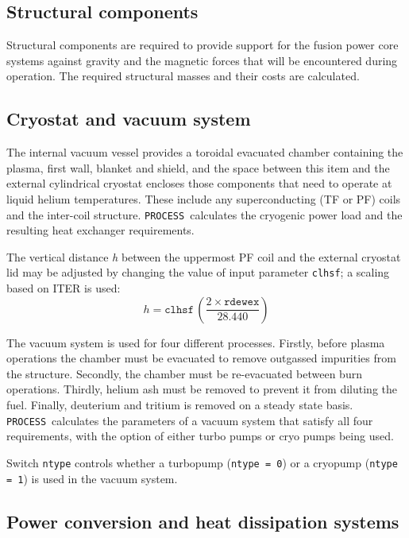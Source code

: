 \documentclass[11pt,a4paper]{report}
\newcommand{\process}{\mbox{\texttt{PROCESS}}}
\begin{document}
\subsection{Structural components}

Structural components are required to provide support for the fusion power
core systems against gravity and the magnetic forces that will be encountered
during operation. The required structural masses and their costs are
calculated.

\subsection{Cryostat and vacuum system}

The internal vacuum vessel provides a toroidal evacuated chamber containing
the plasma, first wall, blanket and shield, and the space between this item
and the external cylindrical cryostat encloses those components that need to
operate at liquid helium temperatures. These include any superconducting (TF
or PF) coils and the inter-coil structure. \process\ calculates the cryogenic
power load and the resulting heat exchanger requirements.

The vertical distance \textit{h}\/ between the uppermost PF coil and the
external cryostat lid may be adjusted by changing the value of input parameter
\texttt{clhsf}; a scaling based on ITER is used:
\begin{equation}
h = \mathtt{clhsf} \, \left( \frac{2 \times \mathtt{rdewex}}{28.440} \right)
\end{equation}

The vacuum system is used for four different processes. Firstly, before plasma
operations the chamber must be evacuated to remove outgassed impurities from
the structure. Secondly, the chamber must be re-evacuated between burn
operations. Thirdly, helium ash must be removed to prevent it from diluting
the fuel. Finally, deuterium and tritium is removed on a steady state
basis. \process\ calculates the parameters of a vacuum system that satisfy
all four requirements, with the option of either turbo pumps or cryo pumps
being used.

Switch \texttt{ntype} controls whether a turbopump (\texttt{ntype = 0}) or a
cryopump (\texttt{ntype = 1}) is used in the vacuum system.

\subsection{Power conversion and heat dissipation systems}
\label{sec:powerflow}
\end{document}
